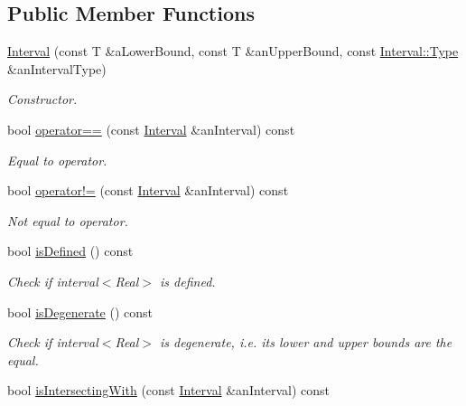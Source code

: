 \subsection*{Public Member Functions}
\begin{DoxyCompactItemize}
\item 
\hyperlink{classlibrary_1_1math_1_1obj_1_1_interval_ad3c3506ca4e90506ab1ea25a18fc5cd7}{Interval} (const T \&a\+Lower\+Bound, const T \&an\+Upper\+Bound, const \hyperlink{classlibrary_1_1math_1_1obj_1_1_interval_abc7177f1c446d8273e70c989953667d1}{Interval\+::\+Type} \&an\+Interval\+Type)
\begin{DoxyCompactList}\small\item\em Constructor. \end{DoxyCompactList}\item 
bool \hyperlink{classlibrary_1_1math_1_1obj_1_1_interval_a99b12768e33b75bf87ab656b92c03e98}{operator==} (const \hyperlink{classlibrary_1_1math_1_1obj_1_1_interval}{Interval} \&an\+Interval) const
\begin{DoxyCompactList}\small\item\em Equal to operator. \end{DoxyCompactList}\item 
bool \hyperlink{classlibrary_1_1math_1_1obj_1_1_interval_a5ca4c08ba0aff1ea42ea3804d51e02cf}{operator!=} (const \hyperlink{classlibrary_1_1math_1_1obj_1_1_interval}{Interval} \&an\+Interval) const
\begin{DoxyCompactList}\small\item\em Not equal to operator. \end{DoxyCompactList}\item 
bool \hyperlink{classlibrary_1_1math_1_1obj_1_1_interval_a2de37bb9d7b97ae7892188c26c99b6fb}{is\+Defined} () const
\begin{DoxyCompactList}\small\item\em Check if interval$<$\+Real$>$ is defined. \end{DoxyCompactList}\item 
bool \hyperlink{classlibrary_1_1math_1_1obj_1_1_interval_a0e9997639f0c415f4f7fe8dcb58e13a8}{is\+Degenerate} () const
\begin{DoxyCompactList}\small\item\em Check if interval$<$\+Real$>$ is degenerate, i.\+e. its lower and upper bounds are the equal. \end{DoxyCompactList}\item 
bool \hyperlink{classlibrary_1_1math_1_1obj_1_1_interval_a5c02f1b4c3a6913a2eb0893d5c3b9925}{is\+Intersecting\+With} (const \hyperlink{classlibrary_1_1math_1_1obj_1_1_interval}{Interval} \&an\+Interval) const

\end{DoxyCompactItemize}
